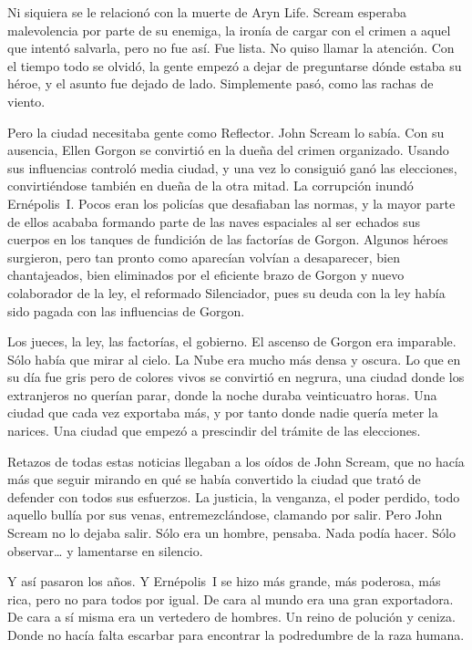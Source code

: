 Ni siquiera se le relacionó con la muerte de Aryn Life. Scream esperaba malevolencia por parte de su enemiga, la ironía de cargar con el crimen a aquel que intentó salvarla, pero no fue así. Fue lista. No quiso llamar la atención. Con el tiempo todo se olvidó, la gente empezó a dejar de preguntarse dónde estaba su héroe, y el asunto fue dejado de lado. Simplemente pasó, como las rachas de viento.

Pero la ciudad necesitaba gente como Reflector. John Scream lo sabía. Con su ausencia, Ellen Gorgon se convirtió en la dueña del crimen organizado. Usando sus influencias controló media ciudad, y una vez lo consiguió ganó las elecciones, convirtiéndose también en dueña de la otra mitad. La corrupción inundó Ernépolis~I. Pocos eran los policías que desafiaban las normas, y la mayor parte de ellos acababa formando parte de las naves espaciales al ser echados sus cuerpos en los tanques de fundición de las factorías de Gorgon. Algunos héroes surgieron, pero tan pronto como aparecían volvían a desaparecer, bien chantajeados, bien eliminados por el eficiente brazo de Gorgon y nuevo colaborador de la ley, el reformado Silenciador, pues su deuda con la ley había sido pagada con las influencias de Gorgon.

Los jueces, la ley, las factorías, el gobierno. El ascenso de Gorgon era imparable. Sólo había que mirar al cielo. La Nube era mucho más densa y oscura. Lo que en su día fue gris pero de colores vivos se convirtió en negrura, una ciudad donde los extranjeros no querían parar, donde la noche duraba veinticuatro horas. Una ciudad que cada vez exportaba más, y por tanto donde nadie quería meter la narices. Una ciudad que empezó a prescindir del trámite de las elecciones.

Retazos de todas estas noticias llegaban a los oídos de John Scream, que no hacía más que seguir mirando en qué se había convertido la ciudad que trató de defender con todos sus esfuerzos. La justicia, la venganza, el poder perdido, todo aquello bullía por sus venas, entremezclándose, clamando por salir. Pero John Scream no lo dejaba salir. Sólo era un hombre, pensaba. Nada podía hacer. Sólo observar\dots{} y lamentarse en silencio.

Y así pasaron los años. Y Ernépolis~I se hizo más grande, más poderosa, más rica, pero no para todos por igual. De cara al mundo era una gran exportadora. De cara a sí misma era un vertedero de hombres. Un reino de polución y ceniza. Donde no hacía falta escarbar para encontrar la podredumbre de la raza humana.

